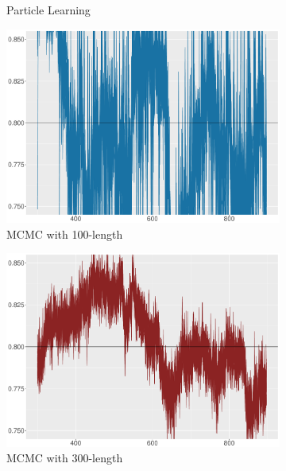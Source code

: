 \begin{figure}[h!]
\begin{subfigure}[t]{0.46\textwidth}
\caption{Particle Learning}
  \end{subfigure}
    \begin{subfigure}[t]{0.46\textwidth}
\includegraphics[width=\textwidth]{Chapters/04Filtering/plot/MCMCchain100.pdf}
  \caption{MCMC with 100-length}
    \end{subfigure}
   \begin{subfigure}[t]{0.46\textwidth}
\includegraphics[width=\textwidth]{Chapters/04Filtering/plot/MCMCchain300.pdf}
 \caption{MCMC with 300-length}
   \end{subfigure}
   \begin{subfigure}[t]{0.46\textwidth}

\end{subfigure}
\end{figure}
